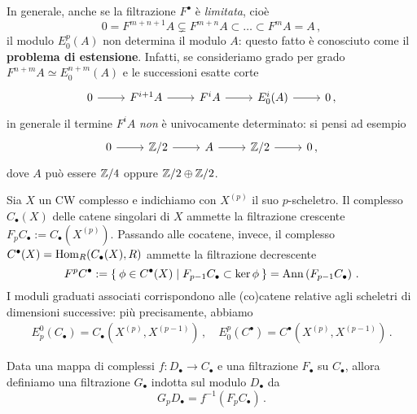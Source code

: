 \begin{oss}
	In generale, anche se la filtrazione $F^{\bullet}$ è \emph{limitata}, cioè
	\begin{equation*}
		0 = F^{m+n+1}A \subsetneq F^{m+n}A \subset \dots \subset F^{m}A = A\,,
	\end{equation*}
	il modulo $E^{p}_{0}(A)$ non determina il modulo $A$: 
	questo fatto è conosciuto come il \textbf{problema di estensione}.
	Infatti, se consideriamo grado per grado $F^{n+m}A \simeq E^{n+m}_{0}(A)$
	e le successioni esatte corte
	\begin{equation*}
		\begin{tikzcd}
			0 \ar[r]
			& F^{i+1}A \ar[r]
			& F^{i}A \ar[r]
			& E^{i}_{0}(A) \ar[r]
			& 0\,,
		\end{tikzcd}
	\end{equation*}
	in generale il termine $F^{i}A$ \emph{non} è univocamente determinato:
	si pensi ad esempio
	\begin{equation*}
		\begin{tikzcd}
			0 \ar[r] & \Z/2 \ar[r] & A \ar[r] & \Z/2 \ar[r] & 0\,,
		\end{tikzcd}
	\end{equation*}
	dove $A$ può essere ${\mathbb Z}/4$ oppure ${\mathbb Z}/2 \oplus {\mathbb Z}/2$.
\end{oss}


\begin{ex}
	Sia $X$ un CW complesso e indichiamo con $X^{(p)}$ il suo $p$-scheletro.
	Il complesso $C_{\bullet}(X)$ delle catene singolari di $X$ ammette 
	la filtrazione crescente $F_{p}C_{\bullet} := C_{\bullet}\left( X^{(p)} \right)$.
	Passando alle cocatene, invece, il complesso $C^{\bullet}(X) = \operatorname{Hom}_{R}(C_{\bullet}(X),R)$
	ammette la filtrazione decrescente
	\begin{equation*}
		F^{p}C^{\bullet} := \Set{\phi \in C^{\bullet}(X) | F_{p-1}C_{\bullet} \subset \ker \phi}
		= \mathrm{Ann}\left( F_{p-1}C_{\bullet} \right)\,.
	\end{equation*}
	I moduli graduati associati corrispondono alle (co)catene relative agli scheletri di
	dimensioni successive: più precisamente, abbiamo
	\begin{align*}
		E^{0}_{p}\left(C_{\bullet}\right) = C_{\bullet}\left( X^{(p)}, X^{(p-1)} \right)\,,
		\quad E_{0}^{p}\left(C^{\bullet}\right) = C^{\bullet}\left( X^{(p)}, X^{(p-1)} \right)\,.
	\end{align*}
\end{ex}

\begin{df}
	Data una mappa di complessi $f:D_{\bullet} \to C_{\bullet}$
	e una filtrazione $F_{\bullet}$ su $C_{\bullet}$,
	allora definiamo una filtrazione $G_{\bullet}$
	indotta sul modulo $D_{\bullet}$ da
	\begin{equation*}
		G_{p}D_{\bullet} = f^{-1}\left(F_{p}C_{\bullet}\right)\,.
	\end{equation*}
\end{df}

